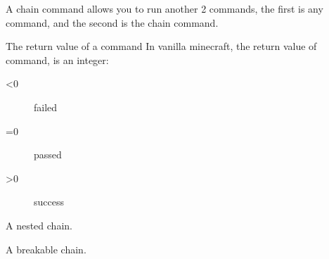 
A chain command allows you to run another 2 commands, the first is any command, and the second is the chain command.

\begin{note}{The return value of a command}
    In vanilla minecraft, the return value of command, is an integer:
    \begin{description}
        \item[<0]{failed}
        \item[=0] {passed}
        \item[>0]{success}
    \end{description}
\end{note}



\begin{example}{A nested chain.}
\end{example}

\begin{example}{A breakable chain.}
\end{example}

